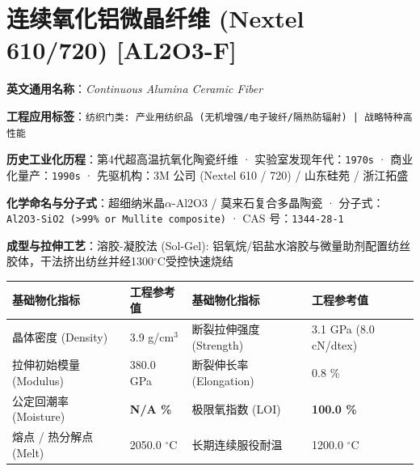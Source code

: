 \documentclass[11pt,openright,twoside,UTF8]{ctexbook}
\begin{document}
\section{连续氧化铝微晶纤维 (Nextel 610/720) [AL2O3-F]}
\label{sec:al2o3-f}

\noindent\textbf{英文通用名称}：\textit{Continuous Alumina Ceramic Fiber}\par
\noindent\textbf{工程应用标签}：\texttt{纺织门类: 产业用纺织品 (无机增强/电子玻纤/隔热防辐射) | 战略特种高性能}\par
\noindent\textbf{历史工业化历程}：第4代超高温抗氧化陶瓷纤维 · 实验室发现年代：\texttt{1970s} · 商业化量产：\texttt{1990s} · 先驱机构：3M 公司 (Nextel 610 / 720) / 山东硅苑 / 浙江拓盛\par
\noindent\textbf{化学命名与分子式}：超细纳米晶$\alpha$-Al2O3 / 莫来石复合多晶陶瓷 · 分子式：\texttt{Al2O3-SiO2 (\textgreater{}99\% or Mullite composite)} · CAS 号：\texttt{1344-28-1}\par
\noindent\textbf{成型与拉伸工艺}：溶胶-凝胶法 (Sol-Gel): 铝氧烷/铝盐水溶胶与微量助剂配置纺丝胶体，干法挤出纺丝并经1300$^\circ\mathrm{C}$受控快速烧结\par

\vspace{0.15cm}
\begin{center}
\small
\begin{tabularx}{\textwidth}{p{3.8cm}Xp{3.8cm}X}
\toprule
\textbf{基础物化指标} & \textbf{工程参考值} & \textbf{基础物化指标} & \textbf{工程参考值} \\
\midrule
晶体密度 (Density) & 3.9 g/cm$^3$ & 断裂拉伸强度 (Strength) & 3.1 GPa (8.0 cN/dtex) \\
拉伸初始模量 (Modulus) & 380.0 GPa & 断裂伸长率 (Elongation) & 0.8 \% \\
公定回潮率 (Moisture) & \textbf{N/A \%} & 极限氧指数 (LOI) & \textbf{100.0 \%} \\
熔点 / 热分解点 (Melt) & 2050.0 $^\circ\mathrm{C}$ & 长期连续服役耐温 & 1200.0 $^\circ\mathrm{C}$ \\
\bottomrule
\end{tabularx}
\end{center}
\vspace{0.15cm}
\end{document}
